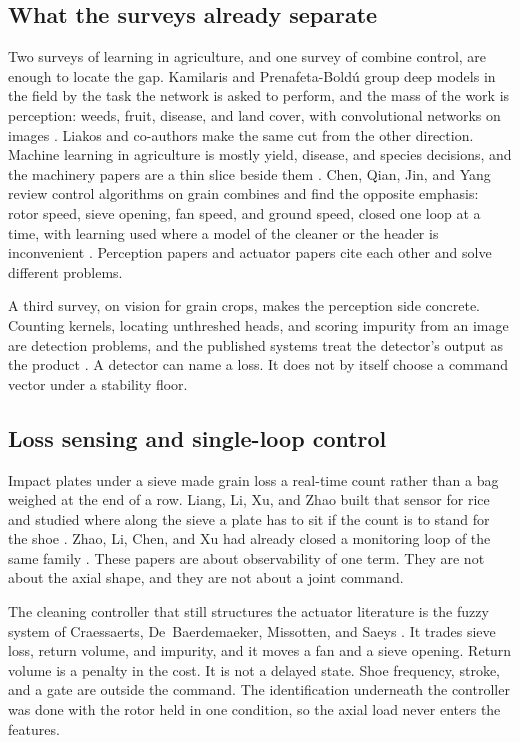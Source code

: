 \subsection{What the surveys already separate}

Two surveys of learning in agriculture, and one survey of combine control, are enough to locate the gap. Kamilaris and Prenafeta-Bold\'u group deep models in the field by the task the network is asked to perform, and the mass of the work is perception: weeds, fruit, disease, and land cover, with convolutional networks on images \cite{kamilaris2018}. Liakos and co-authors make the same cut from the other direction. Machine learning in agriculture is mostly yield, disease, and species decisions, and the machinery papers are a thin slice beside them \cite{liakos2018}. Chen, Qian, Jin, and Yang review control algorithms on grain combines and find the opposite emphasis: rotor speed, sieve opening, fan speed, and ground speed, closed one loop at a time, with learning used where a model of the cleaner or the header is inconvenient \cite{chen2025}. Perception papers and actuator papers cite each other and solve different problems.

A third survey, on vision for grain crops, makes the perception side concrete. Counting kernels, locating unthreshed heads, and scoring impurity from an image are detection problems, and the published systems treat the detector's output as the product \cite{patricio2018}. A detector can name a loss. It does not by itself choose a command vector under a stability floor.

\subsection{Loss sensing and single-loop control}

Impact plates under a sieve made grain loss a real-time count rather than a bag weighed at the end of a row. Liang, Li, Xu, and Zhao built that sensor for rice and studied where along the sieve a plate has to sit if the count is to stand for the shoe \cite{liang2016}. Zhao, Li, Chen, and Xu had already closed a monitoring loop of the same family \cite{zhao2011}. These papers are about observability of one term. They are not about the axial shape, and they are not about a joint command.

The cleaning controller that still structures the actuator literature is the fuzzy system of Craessaerts, De~Baerdemaeker, Missotten, and Saeys \cite{craessaerts2010a}. It trades sieve loss, return volume, and impurity, and it moves a fan and a sieve opening. Return volume is a penalty in the cost. It is not a delayed state. Shoe frequency, stroke, and a gate are outside the command. The identification underneath the controller was done with the rotor held in one condition, so the axial load never enters the features.

